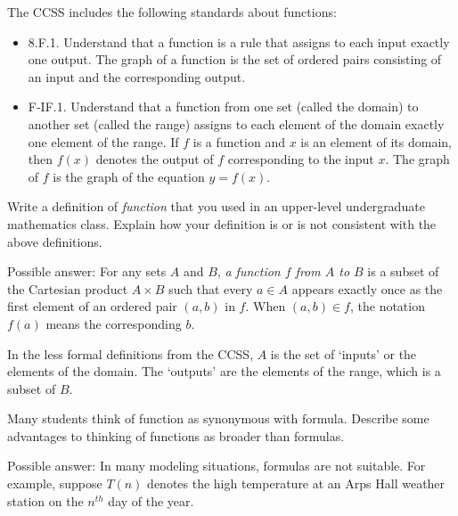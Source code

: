 \documentclass[space,handout,nooutcomes]{ximera}
\begin{document}
The CCSS includes the following standards about functions: 
\begin{itemize}
\item 8.F.1. Understand that a function is a rule that assigns to each input exactly
one output. The graph of a function is the set of ordered pairs
consisting of an input and the corresponding output.

\item F-IF.1. Understand that a function from one set (called the domain) to
another set (called the range) assigns to each element of the domain
exactly one element of the range. If $f$ is a function and $x$ is an element
of its domain, then $f(x)$ denotes the output of $f$ corresponding to the
input $x$. The graph of $f$ is the graph of the equation $y = f(x)$.
\end{itemize}

\begin{question}
Write a definition of \emph{function} that you used in an upper-level undergraduate mathematics class.  Explain how your definition is or is not consistent with the above definitions.  
\begin{freeResponse}
\begin{hint}
Possible answer:  For any sets $A$ and $B$, \emph{a function $f$ from $A$ to $B$} is a subset of the Cartesian product $A\times B$ such that
every $a\in A$ appears exactly once as the first element of an ordered pair $(a,b)$ in $f$. When $(a,b)\in f$, the notation $f(a)$ means the corresponding $b$.  

In the less formal definitions from the CCSS, $A$ is the set of `inputs' or the elements of the domain.  The `outputs' are the elements of the range, which is a subset of $B$.   
\end{hint}
\end{freeResponse}
\end{question}


\begin{question}
Many students think of function as synonymous with formula.  Describe some advantages to thinking of functions as broader than formulas.
\begin{freeResponse}
\begin{hint}
Possible answer:  In many modeling situations, formulas are not suitable.  For example, suppose $T(n)$ denotes the high temperature 
at an Arps Hall weather station on the $n^{th}$ day of the year.  
\end{hint}
\end{freeResponse}
\end{question}
\end{document}
